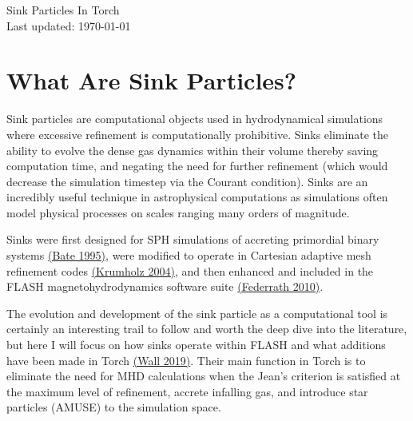 \documentclass[10pt]{article}
\begin{document}
\begin{center}
Sink Particles In Torch \\
Last updated: \today \\
\end{center}





\section{What Are Sink Particles?}
Sink particles are computational objects used in hydrodynamical simulations where excessive refinement is computationally prohibitive. Sinks eliminate the ability to evolve the dense gas dynamics within their volume thereby saving computation time, and negating the need for further refinement (which would decrease the simulation timestep via the Courant condition). Sinks are an incredibly useful technique in astrophysical computations as simulations often model physical processes on scales ranging many orders of magnitude.

Sinks were first designed for SPH simulations of accreting primordial binary systems \href{https://ui.adsabs.harvard.edu/abs/1995MNRAS.277..362B/abstract}{(Bate 1995)}, were modified to operate in Cartesian adaptive mesh refinement codes \href{https://ui.adsabs.harvard.edu/abs/2004ApJ...611..399K/abstract}{(Krumholz 2004)}, and then enhanced and included in the FLASH magnetohydrodynamics software suite \href{https://ui.adsabs.harvard.edu/abs/2010ApJ...713..269F/abstract}{(Federrath 2010)}.

The evolution and development of the sink particle as a computational tool is certainly an interesting trail to follow and worth the deep dive into the literature, but here I will focus on how sinks operate within FLASH and what additions have been made in Torch \href{https://ui.adsabs.harvard.edu/abs/2019ApJ...887...62W/abstract}{(Wall 2019)}. Their main function in Torch is to eliminate the need for MHD calculations when the Jean's criterion is satisfied at the maximum level of refinement, accrete infalling gas, and introduce star particles (AMUSE) to the simulation space.
\end{document}
